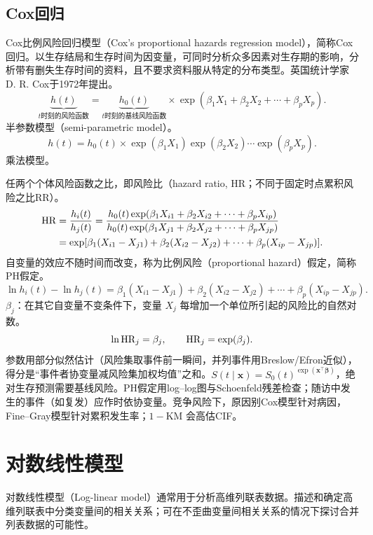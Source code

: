 \subsection{Cox回归}
Cox比例风险回归模型（Cox's proportional hazards regression model），简称Cox回归。以生存结局和生存时间为因变量，可同时分析众多因素对生存期的影响，分析带有删失生存时间的资料，且不要求资料服从特定的分布类型。英国统计学家D. R. Cox于1972年提出。
\[
\underbrace{h(t)}_{t\text{时刻的风险函数}}=
\underbrace{h_0(t)}_{t\text{时刻的基线风险函数}}
\times\exp(\beta_1X_1+\beta_2X_2+\cdots+\beta_pX_p).
\]
半参数模型（semi-parametric model）。
\[
h(t)=h_0(t)\times\exp(\beta_1X_1)\exp(\beta_2X_2)\cdots\exp(\beta_pX_p).
\]
乘法模型。

任两个个体风险函数之比，即风险比（hazard ratio, HR；不同于固定时点累积风险之比RR）。
\begin{align*}
\operatorname{HR}&=\frac{h_i(t)}{h_j(t)}
=\frac{h_0(t)\exp(\beta_1X_{i1}+\beta_2X_{i2}+\cdots+\beta_pX_{ip})}
 {h_0(t)\exp(\beta_1X_{j1}+\beta_2X_{j2}+\cdots+\beta_pX_{jp})}\\
&=\exp[\beta_1(X_{i1}-X_{j1})+\beta_2(X_{i2}-X_{j2})+\cdots+\beta_p(X_{ip}-X_{jp})].
\end{align*}
自变量的效应不随时间而改变，称为比例风险（proportional hazard）假定，简称PH假定。
\[
\ln h_i(t)-\ln h_j(t)=\beta_1(X_{i1}-X_{j1})+\beta_2(X_{i2}-X_{j2})+\cdots+\beta_p(X_{ip}-X_{jp}).
\]
$\beta_j$：在其它自变量不变条件下，变量 $X_j$ 每增加一个单位所引起的风险比的自然对数。
\[
\ln\operatorname{HR}_j=\beta_j,\qquad\operatorname{HR}_j=\exp(\beta_j).
\]
参数用部分似然估计（风险集取事件前一瞬间，并列事件用Breslow/Efron近似），得分是“事件者协变量减风险集加权均值”之和。$S(t\mid\bm x)=S_0(t)^{\exp(\bm x^\top\bm\beta)}$，绝对生存预测需要基线风险。PH假定用log--log图与Schoenfeld残差检查；随访中发生的事件（如复发）应作时依协变量。竞争风险下，原因别Cox模型针对病因，Fine--Gray模型针对累积发生率；$1-\mathrm{KM}$ 会高估CIF。
\section{对数线性模型}
对数线性模型（Log-linear model）通常用于分析高维列联表数据。描述和确定高维列联表中分类变量间的相关关系；可在不歪曲变量间相关关系的情况下探讨合并列表数据的可能性。

